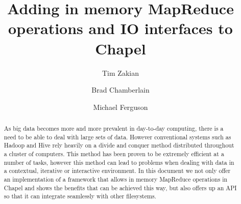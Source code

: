 \documentclass[10pt]{article}
\begin{document}


\title{Adding in memory MapReduce operations and IO interfaces to Chapel}

\author{Tim Zakian \and Brad Chamberlain \and Michael Ferguson}

\maketitle

\begin{abstract}


As big data becomes more and more prevalent in day-to-day computing,
there is a need to be able to deal with large sets of data. However
conventional systems such as Hadoop and Hive rely heavily on a divide and conquer method distributed throughout a
cluster of computers. This method has been proven to be extremely efficient
at a number of tasks, however this method can lead to problems when dealing
with data in a contextual, iterative or interactive environment. In this
document we not only offer an implementation of a framework that allows in memory MapReduce
operations in Chapel and shows the benefits that can be achieved this way,
but also offers up an API so that it can integrate seamlessly with other
filesystems. 
\end{abstract}







\end{document}
